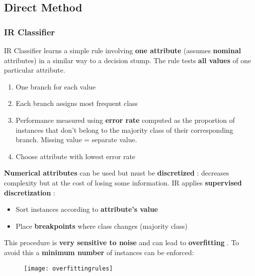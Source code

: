 \subsection{Direct Method}
\subsubsection{IR Classifier}
IR Classifier learns a simple rule involving \textbf{one attribute} (assumes \textbf{nominal} attributes) in a similar way to a decision stump. The rule tests \textbf{all values} of one particular attribute.
\begin{enumerate}
\item One branch for each value
\item Each branch assigns most frequent class
\item Performance measured using \textbf{error rate}	computed as the proportion of instances that don't belong to the majority class of their corresponding branch. Missing value = separate value.
\item Choose attribute with lowest error rate	
\end{enumerate}
\textbf{Numerical attributes} can be used but must be \textbf{discretized} : decreases complexity but at the cost of losing some information. IR applies \textbf{supervised discretization} :
\begin{itemize}
\item Sort instances according to \textbf{attribute's value}
\item Place \textbf{breakpoints} where class changes (majority class)
\end{itemize}
This procedure is \textbf{very sensitive to noise} and can lead to \textbf{overfitting} . To avoid this a \textbf{minimum number} of instances can be enforced:
\begin{figure}[H]
  \centering
  \texttt{[image: overfittingrules]}
\end{figure}

